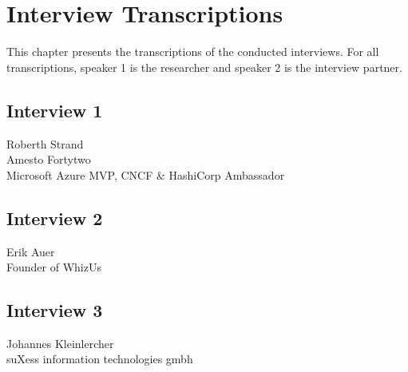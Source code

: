\chapter{Interview Transcriptions}\label{appendix:interview-transcriptions}

This chapter presents the transcriptions of the conducted interviews.
For all transcriptions, speaker 1 is the researcher and speaker 2 is the interview partner.

\section{Interview 1}

Roberth Strand \\
Amesto Fortytwo \\
Microsoft Azure MVP, CNCF \& HashiCorp Ambassador



\pagebreak

\section{Interview 2}

Erik Auer \\
Founder of WhizUs



\pagebreak

\section{Interview 3}

Johannes Kleinlercher \\
suXess information technologies gmbh



\pagebreak


